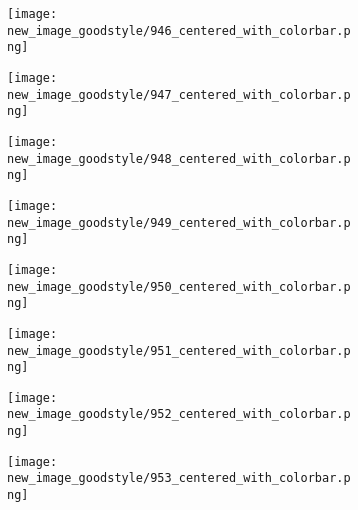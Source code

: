 \documentclass[a4paper,12pt]{article}
\begin{document}
\begin{figure}[H]
  \begin{subfigure}{0.11\textwidth}
    \texttt{[image: new\_image\_goodstyle/946\_centered\_with\_colorbar.png]}
  \end{subfigure}
  \hfill
  \begin{subfigure}{0.11\textwidth}
    \texttt{[image: new\_image\_goodstyle/947\_centered\_with\_colorbar.png]}
  \end{subfigure}
  \hfill
  \begin{subfigure}{0.11\textwidth}
    \texttt{[image: new\_image\_goodstyle/948\_centered\_with\_colorbar.png]}
  \end{subfigure}
  \hfill
  \begin{subfigure}{0.11\textwidth}
    \texttt{[image: new\_image\_goodstyle/949\_centered\_with\_colorbar.png]}
  \end{subfigure}
  \hfill
  \begin{subfigure}{0.11\textwidth}
    \texttt{[image: new\_image\_goodstyle/950\_centered\_with\_colorbar.png]}
  \end{subfigure}
  \hfill
  \begin{subfigure}{0.11\textwidth}
    \texttt{[image: new\_image\_goodstyle/951\_centered\_with\_colorbar.png]}
  \end{subfigure}
  \hfill
  \begin{subfigure}{0.11\textwidth}
    \texttt{[image: new\_image\_goodstyle/952\_centered\_with\_colorbar.png]}
  \end{subfigure}
  \hfill
  \begin{subfigure}{0.11\textwidth}
    \texttt{[image: new\_image\_goodstyle/953\_centered\_with\_colorbar.png]}
  \end{subfigure}
  \hfill
\end{figure}
\end{document}
